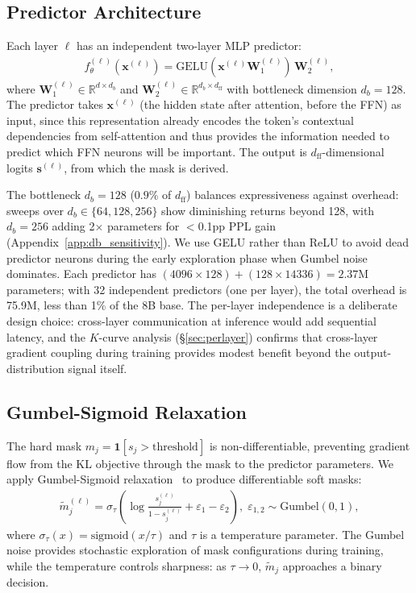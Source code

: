 \subsection{Predictor Architecture}
\label{sec:method:predictor}

Each layer $\ell$ has an independent two-layer MLP predictor:
\begin{align}
f_\theta^{(\ell)}(\mathbf{x}^{(\ell)}) = \text{GELU}(\mathbf{x}^{(\ell)} \mathbf{W}_1^{(\ell)}) \, \mathbf{W}_2^{(\ell)},
\label{eq:predictor}
\end{align}
where $\mathbf{W}_1^{(\ell)} \in \mathbb{R}^{d \times d_b}$ and $\mathbf{W}_2^{(\ell)} \in \mathbb{R}^{d_b \times d_{\text{ff}}}$ with bottleneck dimension $d_b{=}128$.
The predictor takes $\mathbf{x}^{(\ell)}$ (the hidden state after attention, before the FFN) as input, since this representation already encodes the token's contextual dependencies from self-attention and thus provides the information needed to predict which FFN neurons will be important.
The output is $d_{\text{ff}}$-dimensional logits $\mathbf{s}^{(\ell)}$, from which the mask is derived.

The bottleneck $d_b{=}128$ ($0.9\%$ of $d_{\text{ff}}$) balances expressiveness against overhead: sweeps over $d_b \in \{64, 128, 256\}$ show diminishing returns beyond 128, with $d_b{=}256$ adding 2$\times$ parameters for $<$0.1pp PPL gain (Appendix~\ref{app:db_sensitivity}).
We use GELU rather than ReLU to avoid dead predictor neurons during the early exploration phase when Gumbel noise dominates.
Each predictor has $(4096 \times 128) + (128 \times 14336) = 2.37\text{M}$ parameters; with 32 independent predictors (one per layer), the total overhead is 75.9M, less than 1\% of the 8B base.
The per-layer independence is a deliberate design choice: cross-layer communication at inference would add sequential latency, and the $K$-curve analysis (\S\ref{sec:perlayer}) confirms that cross-layer gradient coupling during training provides modest benefit beyond the output-distribution signal itself.


\subsection{Gumbel-Sigmoid Relaxation}
\label{sec:method:gumbel}

The hard mask $m_j = \mathbf{1}[s_j > \text{threshold}]$ is non-differentiable, preventing gradient flow from the KL objective through the mask to the predictor parameters.
We apply Gumbel-Sigmoid relaxation~\cite{maddison2017concrete,louizos2018l0,jang2017gumbel} to produce differentiable soft masks:
{\small
\begin{align}
\tilde{m}_j^{(\ell)} \!=\! \sigma_\tau\!\left(\!\log \frac{s_j^{(\ell)}}{1 {-} s_j^{(\ell)}} + \varepsilon_1 {-} \varepsilon_2\right)\!,\; \varepsilon_{1,2} {\sim} \text{Gumbel}(0,1),
\label{eq:gumbel}
\end{align}}
where $\sigma_\tau(x) = \text{sigmoid}(x / \tau)$ and $\tau$ is a temperature parameter.
The Gumbel noise provides stochastic exploration of mask configurations during training, while the temperature controls sharpness: as $\tau \to 0$, $\tilde{m}_j$ approaches a binary decision.


